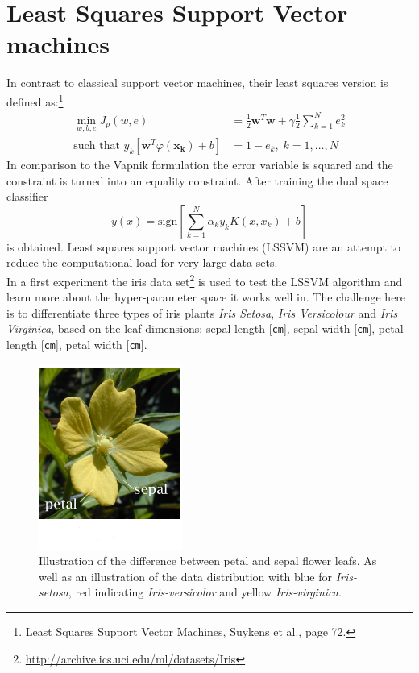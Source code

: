 \section{Least Squares Support Vector machines}
In contrast to classical support vector machines, their least squares version is defined as:\footnote{Least Squares Support Vector Machines, Suykens et al., page 72.}
\begin{align}
\min_{w,b,e} J_p (w,e) &= \frac{1}{2}\mathbf{w}^T\mathbf{w} + \gamma \frac{1}{2} \sum_{k=1}^N e_k^2 \\
\text{such that } y_k [\mathbf{w}^T \varphi(\mathbf{x_k}) + b] &= 1 - e_k, \; k = 1,\dots,N
\end{align}
In comparison to the Vapnik formulation the error variable is squared and the constraint is turned into an equality constraint. After training the dual space classifier
\begin{equation}
y(x) = \text{sign}[\sum_{k = 1}^N \alpha_k y_k K(x,x_k) + b]
\end{equation}
is obtained. Least squares support vector machines (LSSVM) are an attempt to reduce the computational load for very large data sets. \\
In a first experiment the iris data set\footnote{\url{http://archive.ics.uci.edu/ml/datasets/Iris}} is used to test the LSSVM algorithm and learn more about the hyper-parameter space it works well in. The challenge here is to differentiate three types of iris plants \textit{Iris Setosa}, \textit{Iris Versicolour} and \textit{Iris Virginica}, based on the leaf dimensions: sepal length [\texttt{cm}], sepal width [\texttt{cm}], petal length [\texttt{cm}], petal width [\texttt{cm}].
\begin{figure}
\centering
\includegraphics[width=0.25\linewidth]{../src/figure/petalSepalUP}


\caption{Illustration of the difference between petal and sepal flower leafs. As well as an illustration of the data distribution with blue for \textit{Iris-setosa}, red indicating \textit{Iris-versicolor} and yellow \textit{Iris-virginica}.}
\label{fig:originalIris}
\end{figure}
